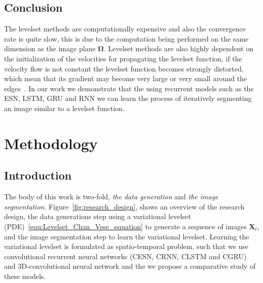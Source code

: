 \documentclass{WitsPhysicsReport}
\begin{document}
\subsection{Conclusion}
The levelset methods are computationally expensive and also the convergence rate is quite slow, this is due to the computation being performed on the same dimension as the image plane $\mathbf{\Omega}$. Levelset methods are also highly dependent on the initialization of the velocities for propagating the levelset function, if the velocity flow is not constant the levelset function becomes strongly distorted, which mean that its gradient may become very large or very small around the edges~\cite{ovsyannikov2013further}. In our work we demonstrate that the using recurrent models such as the  ESN, LSTM, GRU and RNN we can learn the process of iteratively segmenting an image similar to a levelset function. 



\newpage
\section{Methodology}
\label{sec:Methodology}


\subsection{Introduction}
The body of this work is two-fold, \textit{the data generation} and \textit{the image segmentation}. Figure~\ref{fig:research_design}, shows an overview of the research design, the data generations step using a variational levelset (PDE)~\ref{equ:Levelset_Chan_Vese_equation} to generate a sequence of images ${\mathbf{X}}_t$, and the image segmentation step to learn the variational levelset. Learning the variational levelset is formulated as spatio-temporal problem, such that we use convolutional recurrent neural networks (CESN, CRNN, CLSTM and CGRU) and 3D-convolutional neural network and the we  propose a comparative study of these models.

\end{document}
